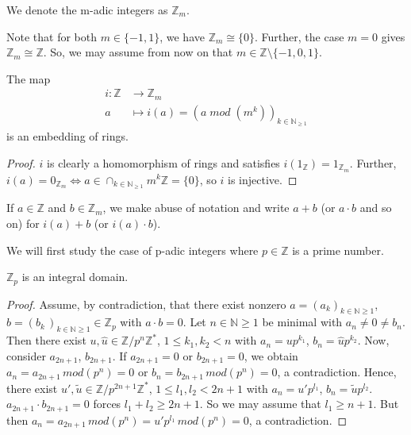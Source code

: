 \begin{notation}
We denote the m-adic integers as $\mathbb{Z}_m$.
\end{notation}

Note that for both $m \in \{-1, 1\}$, we have $\mathbb{Z}_m \cong \{ 0 \}$. Further, the case $m = 0$ gives $\mathbb{Z}_m \cong \mathbb{Z}$. So, we may assume from now on that $m \in \mathbb{Z} \setminus \{ -1, 0, 1 \}$.

\begin{lemma}
The map
\begin{align*} i : \mathbb{Z} & \longrightarrow \mathbb{Z}_m \\ a & \longmapsto i(a) = (a \; mod \; (m^k))_{k \in \mathbb{N}_{\geq 1} }
\end{align*}
is an embedding of rings.
\end{lemma}

\begin{proof}
$i$ is clearly a homomorphism of rings and satisfies $i(1_{\mathbb{Z}}) = 1_{\mathbb{Z}_m}$. Further, $i(a) = 0_{\mathbb{Z}_m } \Leftrightarrow a \in \cap_{k \in \mathbb{N}_{ \geq 1 } } m^k \mathbb{Z} = \{ 0 \}$, so $i$ is injective.
\end{proof}

\begin{notation}
If $a \in \mathbb{Z}$ and $b \in \mathbb{Z}_m$, we make abuse of notation and write $a + b$ (or $a \cdot b$ and so on) for $i(a) + b$ (or $i(a) \cdot b$).
\end{notation}

We will first study the case of p-adic integers where $p \in \mathbb{Z}$ is a prime number.
\begin{proposition}
$\mathbb{Z}_p$ is an integral domain.
\end{proposition}

\begin{proof}
Assume, by contradiction, that there exist nonzero $a = (a_k )_{k \in \mathbb{N} \geq 1}$,$b = (b_k \,)_{k \in \mathbb{N} \geq 1 } \in \mathbb{Z}_p$ with $a \cdot b = 0$. Let $n \in \mathbb{N} \geq 1$ be minimal with $a_n  \neq 0 \neq b_n$. Then there exist $u, \hat{u} \in \mathbb{Z} / p^n \mathbb{Z}^*$, $1 \leq k_1, k_2 < n$ with $a_n = up^{k_1}$, $b_n = \hat{u} p^{k_2}$. \newline
Now, consider $a_{2n + 1}$, $b_{2n+1}$. If $a_{2n+1} = 0$ or $b_{2n+1} = 0$, we obtain $a_n = a_{2n+1} \, mod(p^n) = 0$ or $b_n = b_{2n+1} \, mod (p^n) = 0$, a contradiction. Hence, there exist $u', \tilde{u} \in \mathbb{Z} / p^{2n+1} \mathbb{Z}^*$, $1 \leq l_1, l_2 < 2n+1$ with $a_n = u'p^{l_1}$, $b_n = \tilde{u} p^{l_2}$. $a_{2n+1} \cdot b_{2n+1} = 0$ forces $l_1 + l_2 \geq 2n+1$. So we may assume that $l_1 \geq n+1$. But then $a_n = a_{2n+1} \, mod(p^n) = u'p^{l_1} \, mod(p^n) = 0$, a contradiction. 
\end{proof}

